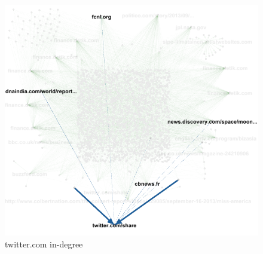 \documentclass[a4paper,12pt]{article}
\begin{document}
\begin{figure}
\center
\includegraphics[width=\linewidth]{indegree.png} 
\caption{twitter.com in-degree}
\end{figure}
\end{document}
